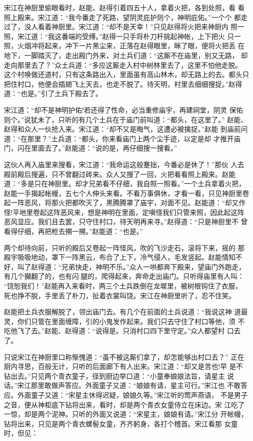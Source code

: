宋江在神厨里偷眼看时，赵能、赵得引着四五十人，拿着火把，各到处照，看
看照上殿来。宋江道：“我今番走了死路，望阴灵庇护则个，神明庇佑。”一个个
都走过了，没人看着神厨里。宋江道：“却不是天幸！”只见赵得将火把来神厨内
照一照，宋江道：“我这番端的受缚。”赵得一只手将朴刀杆挑起神帐，上下把火
只一照，火烟冲将起来，冲下一片黑尘来，正落在赵得眼里，眯了眼，便将火把丢
在地下，一脚踏灭了，走出殿门外来，对土兵们道：“这厮不在庙里，别又无路，
却走向那里去了？”众土兵道：“多应这厮走入村中树林里去了，这里不怕他走脱。
这个村唤做还道村，只有这条路出入，里面虽有高山林木，却无路上的去。都头只
把住村口，他便会插翅飞上天去，也走不脱了。待天明，村里去细细搜捉。”赵得
道：“也是。”引了土兵下殿去了。

宋江道：“却不是神明护佑!若还得了性命，必当重修庙宇，再建祠堂，阴灵
保佑则个。”说犹未了，只听的有几个土兵在于庙门前叫道：“都头，在这里了。”
赵能、赵得和众人一伙抢入来。宋江道：“却不又是晦气，这遭必被擒捉。”赵能
到庙前问道：“在那里？”土兵道：“都头，你来看庙门上两个尘手迹，以定是却
才推开庙门，闪在里面去了。”赵能道：“说的是，再仔细搜一搜看。”

这伙人再入庙里来搜看，宋江道：“我命运这般蹇拙，今番必是休了！”那伙
人去殿前殿后搜遍，只不曾翻过砖来。众人又搜了一回，火把看看照上殿来。赵能
道：“多是只在神厨里。却才兄弟看不仔细，我自照一照看。”一个土兵拿着火把，
赵能一手揭起帐幔，五七个人伸头来看。不看万事俱休，才看一看，只见神厨里卷
起一阵恶风，将那火把都吹灭了，黑腾腾罩了庙宇，对面不见。赵能道：“却又作
怪!平地里卷起这阵恶风来，想是神明在里面，定嗔怪我们只管来照，因此起这阵
恶风显应。我们且去罢，只守住村口，待天明再来寻。”赵得道：“只是神厨里不
曾看得仔细，再把枪去搠一搠。”赵能道：“也是。”

两个却待向前，只听的殿后又卷起一阵怪风，吹的飞沙走石，滚将下来，摇的
那殿宇吸吸地动，罩下一阵黑云，布合了上下，冷气侵人，毛发竖起。赵能情知不
好，叫了赵得道：“兄弟快走，神明不乐。”众人一哄都奔下殿来，望庙门外跑走，
有几个攧翻了的，也有闪腿的，爬得起来，奔命走出庙门。只听得庙里有人叫：
“饶恕我们！”赵能再入来看时，两三个土兵跌倒在龙墀里，被树根钩住了衣服，
死也挣不脱，手里丢了朴刀，扯着衣裳叫饶。宋江在神厨里听了，忍不住笑。

赵能把土兵衣服解脱了，领出庙门去。有几个在前面的土兵说道：“我说这神
道最灵，你们只管在里面缠障，引的小鬼发作起来。我们只去守住了村口等他，须
不吃他飞了去。”赵能、赵得道：“说得是。只消村口四下里守定。”众人都望村
口去了。

只说宋江在神厨里口称惭愧道：“虽不被这厮们拿了，却怎能够出村口去？”
正在厨内寻思，百般无计，只听的后面廊下有人出来。宋江道：“却又是苦也!早
是不钻出去。”只见两个青衣童子，径到厨边举口道：“小童奉娘娘法旨，请星主
说话。”宋江那里敢做声答应。外面童子又道：“娘娘有请，星主可行。”宋江也
不敢答应。外面童子又道：“宋星主休得迟疑，娘娘久等。”宋江听的莺声燕语，
不是男子之音，便从神柜底下钻将出来，看时，却是两个青衣女童侍立在床边。宋
江吃了一惊，却是两个泥神。只听的外面又说道：“宋星主，娘娘有请。”宋江分
开帐幔，钻将出来，只见是两个青衣螺髻女童，齐齐躬身，各打个稽首。宋江看那
女童时，但见：

